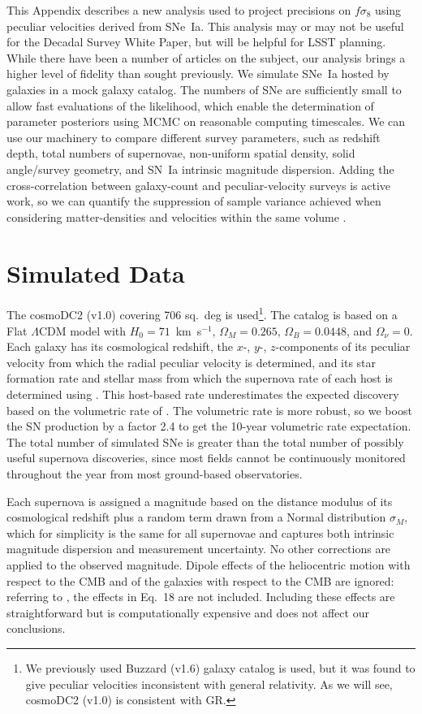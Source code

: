 \documentclass{aastex62}   	%
\begin{document}
This Appendix describes a new analysis used to project precisions on $f\sigma_8$ using peculiar velocities derived from SNe~Ia.
This analysis may or may not be useful for the Decadal Survey White Paper, but will be helpful for LSST planning.
While there have been a number of articles on the subject,
our analysis brings a higher level of fidelity than sought previously.  We simulate SNe~Ia hosted by galaxies in a mock galaxy
catalog. The numbers of SNe are sufficiently small to allow fast evaluations of the likelihood, which enable the determination of parameter
posteriors using MCMC on reasonable computing timescales.   We can use our machinery to 
compare different survey parameters, such as redshift depth, total numbers of supernovae, non-uniform spatial density,
solid angle/survey geometry, and SN~Ia intrinsic magnitude dispersion.
Adding the cross-correlation between galaxy-count and peculiar-velocity surveys is active work, so we can
quantify the suppression of sample variance achieved when considering matter-densities and velocities 
within the same volume \citep{2007PhRvL..99h1301G}.

\section{Simulated Data}
The cosmoDC2 (v1.0) covering 706 sq.~deg is used\footnote{We previously used
Buzzard (v1.6) galaxy catalog is used, but it was found to give peculiar velocities inconsistent with general relativity.  As we will see,
cosmoDC2 (v1.0) is consistent with GR. }. 
The catalog is based on a Flat $\Lambda$CDM model with $H_0=71$~km~s$^{-1}$,  $\Omega_M=0.265$, $\Omega_B=0.0448$, and
$\Omega_\nu=0$.
Each galaxy has its cosmological redshift, the $x$-, $y$-, $z$-components of its peculiar velocity from which
the radial peculiar velocity is determined, and its
star formation rate and stellar mass from which the
supernova rate of each host is determined using 
\citet{2012ApJ...755...61S}.   This host-based rate
underestimates the expected discovery based on the volumetric
rate of \citet{2010ApJ...713.1026D}.  The volumetric rate is more robust, so  we boost the SN production
by a factor 2.4 to get the 10-year volumetric rate expectation. The total number of simulated SNe 
is greater than the total number of possibly useful supernova discoveries, since most fields cannot be continuously monitored throughout the year
from most ground-based observatories.


Each supernova is assigned a magnitude based on the distance modulus of its cosmological
redshift plus a random term drawn from a Normal distribution $\sigma_M$, which for simplicity is the same for all supernovae and captures both
intrinsic magnitude dispersion and measurement uncertainty.  No other corrections are applied to the observed magnitude.  Dipole effects of the heliocentric
motion with respect to the CMB and of the galaxies with respect to the CMB  are ignored: referring to
\citet{2011ApJ...741...67D}, the effects in Eq.~18 are not included.  Including these effects are straightforward but is computationally expensive
and does not affect our conclusions.
\end{document}

